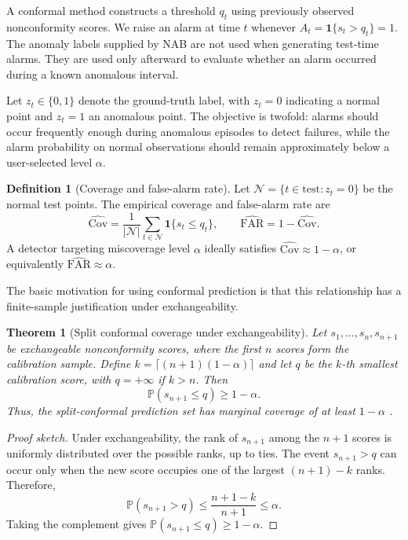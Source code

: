 \documentclass[11pt]{article}
\newtheorem{theorem}{Theorem}
\theoremstyle{definition}
\newtheorem{definition}{Definition}
\theoremstyle{remark}
\newcommand{\Prob}{\mathbb{P}}
\newcommand{\ind}[1]{\mathbf{1}\{#1\}}
\begin{document}
A conformal method constructs a threshold $q_t$ using previously observed nonconformity scores. We raise an alarm at time $t$ whenever $A_t = \ind{s_t > q_t} = 1$. The anomaly labels supplied by NAB are not used when generating test-time alarms. They are used only afterward to evaluate whether an alarm occurred during a known anomalous interval.

Let $z_t \in \{0, 1\}$ denote the ground-truth label, with $z_t = 0$ indicating a normal point and $z_t = 1$ an anomalous point. The objective is twofold: alarms should occur frequently enough during anomalous episodes to detect failures, while the alarm probability on normal observations should remain approximately below a user-selected level $\alpha$.

\begin{definition}[Coverage and false-alarm rate]\label{def:coverage}
Let $\mathcal{N} = \{ t \in \text{test} : z_t = 0 \}$ be the normal test points. The empirical coverage and false-alarm rate are
\[
  \widehat{\mathrm{Cov}} = \frac{1}{|\mathcal{N}|} \sum_{t \in \mathcal{N}} \ind{s_t \le q_t},
  \qquad
  \widehat{\mathrm{FAR}} = 1 - \widehat{\mathrm{Cov}} .
\]
A detector targeting miscoverage level $\alpha$ ideally satisfies
$\widehat{\mathrm{Cov}} \approx 1 - \alpha$, or equivalently
$\widehat{\mathrm{FAR}} \approx \alpha$.
\end{definition}

The basic motivation for using conformal prediction is that this relationship has a finite-sample justification under exchangeability.

\begin{theorem}[Split conformal coverage under exchangeability]\label{thm:split}
Let $s_1, \ldots, s_n, s_{n+1}$ be exchangeable nonconformity scores, where the first $n$ scores form the calibration sample. Define $k = \lceil (n+1)(1-\alpha) \rceil$ and let $q$ be the $k$-th smallest calibration score, with $q = +\infty$ if $k > n$. Then
\[
  \Prob(s_{n+1} \le q) \ge 1 - \alpha .
\]
Thus, the split-conformal prediction set has marginal coverage of at least $1-\alpha$ \cite{vovk2005algorithmic,lei2018distribution}.
\end{theorem}

\begin{proof}[Proof sketch]
Under exchangeability, the rank of $s_{n+1}$ among the $n+1$ scores is uniformly distributed over the possible ranks, up to ties. The event $s_{n+1} > q$ can occur only when the new score occupies one of the largest $(n+1) - k$ ranks. Therefore,
\[
  \Prob(s_{n+1} > q) \le \frac{n+1-k}{n+1} \le \alpha .
\]
Taking the complement gives $\Prob(s_{n+1} \le q) \ge 1 - \alpha$.
\end{proof}
\end{document}
